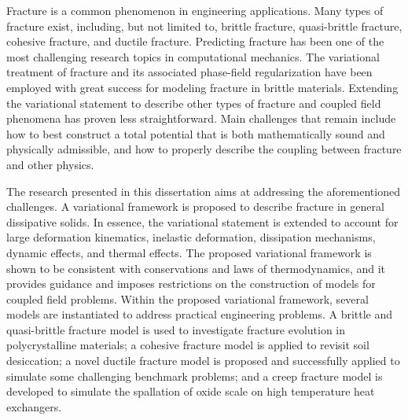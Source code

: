 \abstract

Fracture is a common phenomenon in engineering applications. Many types of fracture exist, including, but not limited to, brittle fracture, quasi-brittle fracture, cohesive fracture, and ductile fracture. Predicting fracture has been one of the most challenging research topics in computational mechanics. The variational treatment of fracture and its associated phase-field regularization have been employed with great success for modeling fracture in brittle materials. Extending the variational statement to describe other types of fracture and coupled field phenomena has proven less straightforward. Main challenges that remain include how to best construct a total potential that is both mathematically sound and physically admissible, and how to properly describe the coupling between fracture and other physics.

The research presented in this dissertation aims at addressing the aforementioned challenges. A variational framework is proposed to describe fracture in general dissipative solids. In essence, the variational statement is extended to account for large deformation kinematics, inelastic deformation, dissipation mechanisms, dynamic effects, and thermal effects. The proposed variational framework is shown to be consistent with conservations and laws of thermodynamics, and it provides guidance and imposes restrictions on the construction of models for coupled field problems. Within the proposed variational framework, several models are instantiated to address practical engineering problems. A brittle and quasi-brittle fracture model is used to investigate fracture evolution in polycrystalline materials; a cohesive fracture model is applied to revisit soil desiccation; a novel ductile fracture model is proposed and successfully applied to simulate some challenging benchmark problems; and a creep fracture model is developed to simulate the spallation of oxide scale on high temperature heat exchangers.
